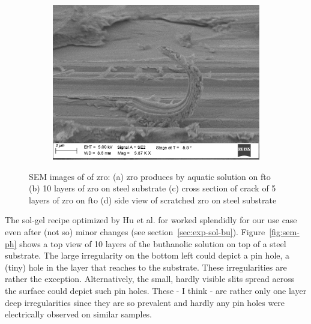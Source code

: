 \begin{figure}[bht]
\begin{subfigure}{.45\textwidth}
		\caption{}%
		\label{fig:sem-cs1}
    \end{subfigure}
    \begin{subfigure}{.45\textwidth}
        \centering
        \includegraphics[width=.8\textwidth]{Pics/sem/150_steel_cs_2Fx5.png}
		\caption{}%
		\label{fig:sem-cs2}
    \end{subfigure}
	\caption{
		SEM images of of \gls{zro}:
		(a) \gls{zro} produces by aquatic solution on \gls{fto}
		(b) 10 layers of \gls{zro} on steel substrate
		(c) cross section of crack of 5 layers of \gls{zro} on \gls{fto}
		(d) side view of scratched \gls{zro} on steel substrate
		\label{fig:sem}
	}
\end{figure}
\enlargethispage{-\baselineskip}

The sol-gel recipe optimized by Hu et al.\cite{Hu2016} for  worked splendidly for our use case even after (not so) minor changes (see section~\ref{sec:exp-sol-bu}). 
%
Figure~\ref{fig:sem-ph} shows a top view of 10 layers of the buthanolic solution on top of a steel substrate. 
The large irregularity on the bottom left could depict a pin hole, a (tiny) hole in the layer that reaches to the substrate. 
These irregularities are rather the exception. 
Alternatively, the small, hardly visible slits spread across the surface could depict such pin holes. 
These - I think - are rather only one layer deep irregularities since they are so prevalent
and hardly any pin holes were electrically observed on similar samples. 

